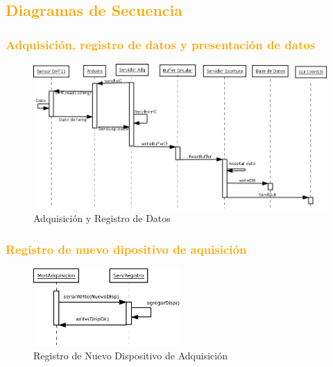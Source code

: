 \newpage
\subsection{\textcolor{orange}{Diagramas de Secuencia}}
\subsubsection{\textcolor{orange}{Adquisición, registro de datos y presentación de datos}}
\begin{figure}[h!]
 \begin{center}
  \includegraphics[width=1\textwidth,keepaspectratio=true]{img/Diagrama_secuencia.png}
  \caption{Adquisición y Registro de Datos}
  \label{fig:esquema}
 \end{center}
\end{figure}
\subsubsection{\textcolor{orange}{Registro de nuevo dipositivo de aquisición}}
\begin{figure}[h!]
 \begin{center}
  \includegraphics[width=0.5\textwidth,keepaspectratio=true]{img/agregardisp.png}
  \caption{Registro de Nuevo Dispositivo de Adquisición}
  \label{fig:esquema}
 \end{center}
\end{figure}
\newpage
